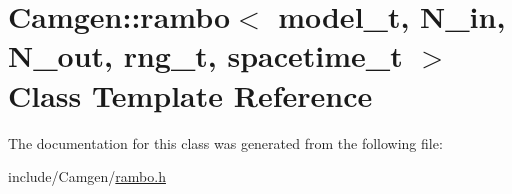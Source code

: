 \hypertarget{a00468}{}\section{Camgen\+:\+:rambo$<$ model\+\_\+t, N\+\_\+in, N\+\_\+out, rng\+\_\+t, spacetime\+\_\+t $>$ Class Template Reference}
\label{a00468}


The documentation for this class was generated from the following file\+:\begin{DoxyCompactItemize}
\item 
include/\+Camgen/\hyperlink{a00756}{rambo.\+h}\end{DoxyCompactItemize}

